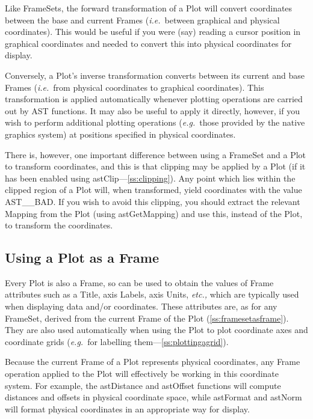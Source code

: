 \documentclass[twoside,11pt]{article}
\newcommand{\htmlref}[2]{#1}
\newcommand{\secref}[1]{\S\ref{#1}}
\renewcommand{\secref}[1]{\ref{#1}}
\begin{document}
Like FrameSets, the forward transformation of a \htmlref{Plot}{Plot} will convert
coordinates between the base and current Frames ({\em{i.e.}}\ between
graphical and physical coordinates). This would be useful if you were
(say) reading a cursor position in graphical coordinates and needed to
convert this into physical coordinates for display.

Conversely, a Plot's inverse transformation converts between its
current and base Frames ({\em{i.e.}}\ from physical coordinates to
graphical coordinates). This transformation is applied automatically
whenever plotting operations are carried out by AST functions. It may
also be useful to apply it directly, however, if you wish to perform
additional plotting operations ({\em{e.g.}}\ those provided by the
native graphics system) at positions specified in physical
coordinates.

There is, however, one important difference between using a \htmlref{FrameSet}{FrameSet}
and a Plot to transform coordinates, and this is that clipping may be
applied by a Plot (if it has been enabled using
\htmlref{astClip}{astClip}---\secref{ss:clipping}). Any point which lies within the
clipped region of a Plot will, when transformed, yield coordinates
with the value AST\_\_BAD. If you wish to avoid this clipping, you
should extract the relevant \htmlref{Mapping}{Mapping} from the Plot (using
\htmlref{astGetMapping}{astGetMapping}) and use this, instead of the Plot, to transform the
coordinates.

\subsection{Using a Plot as a Frame}

Every \htmlref{Plot}{Plot} is also a \htmlref{Frame}{Frame}, so can be used to obtain the values of
Frame attributes such as a \htmlref{Title}{Title}, axis Labels, axis Units,
{\em{etc.,}} which are typically used when displaying data and/or
coordinates. These attributes are, as for any \htmlref{FrameSet}{FrameSet}, derived from
the current Frame of the Plot (\secref{ss:framesetasframe}). They are
also used automatically when using the Plot to plot coordinate axes
and coordinate grids ({\em{e.g.}}\ for labelling
them---\secref{ss:plottingagrid}).

Because the current Frame of a Plot represents physical coordinates,
any Frame operation applied to the Plot will effectively be working in
this coordinate system. For example, the \htmlref{astDistance}{astDistance} and \htmlref{astOffset}{astOffset}
functions will compute distances and offsets in physical coordinate
space, while \htmlref{astFormat}{astFormat} and \htmlref{astNorm}{astNorm} will format physical coordinates in
an appropriate way for display.
\end{document}
